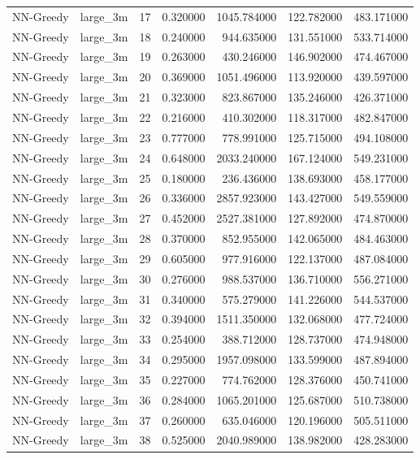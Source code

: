 \begin{tabular}{llrrrrr}
NN-Greedy & large_3m & 17 & 0.320000 & 1045.784000 & 122.782000 & 483.171000 \\
NN-Greedy & large_3m & 18 & 0.240000 & 944.635000 & 131.551000 & 533.714000 \\
NN-Greedy & large_3m & 19 & 0.263000 & 430.246000 & 146.902000 & 474.467000 \\
NN-Greedy & large_3m & 20 & 0.369000 & 1051.496000 & 113.920000 & 439.597000 \\
NN-Greedy & large_3m & 21 & 0.323000 & 823.867000 & 135.246000 & 426.371000 \\
NN-Greedy & large_3m & 22 & 0.216000 & 410.302000 & 118.317000 & 482.847000 \\
NN-Greedy & large_3m & 23 & 0.777000 & 778.991000 & 125.715000 & 494.108000 \\
NN-Greedy & large_3m & 24 & 0.648000 & 2033.240000 & 167.124000 & 549.231000 \\
NN-Greedy & large_3m & 25 & 0.180000 & 236.436000 & 138.693000 & 458.177000 \\
NN-Greedy & large_3m & 26 & 0.336000 & 2857.923000 & 143.427000 & 549.559000 \\
NN-Greedy & large_3m & 27 & 0.452000 & 2527.381000 & 127.892000 & 474.870000 \\
NN-Greedy & large_3m & 28 & 0.370000 & 852.955000 & 142.065000 & 484.463000 \\
NN-Greedy & large_3m & 29 & 0.605000 & 977.916000 & 122.137000 & 487.084000 \\
NN-Greedy & large_3m & 30 & 0.276000 & 988.537000 & 136.710000 & 556.271000 \\
NN-Greedy & large_3m & 31 & 0.340000 & 575.279000 & 141.226000 & 544.537000 \\
NN-Greedy & large_3m & 32 & 0.394000 & 1511.350000 & 132.068000 & 477.724000 \\
NN-Greedy & large_3m & 33 & 0.254000 & 388.712000 & 128.737000 & 474.948000 \\
NN-Greedy & large_3m & 34 & 0.295000 & 1957.098000 & 133.599000 & 487.894000 \\
NN-Greedy & large_3m & 35 & 0.227000 & 774.762000 & 128.376000 & 450.741000 \\
NN-Greedy & large_3m & 36 & 0.284000 & 1065.201000 & 125.687000 & 510.738000 \\
NN-Greedy & large_3m & 37 & 0.260000 & 635.046000 & 120.196000 & 505.511000 \\
NN-Greedy & large_3m & 38 & 0.525000 & 2040.989000 & 138.982000 & 428.283000 \\

\end{tabular}
